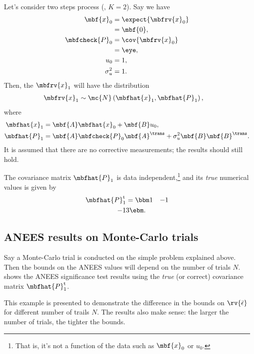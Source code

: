 \documentclass{simple-article}
\begin{document}
Let's consider two steps process (\ie, $K = 2$). Say we have 
\begin{align}
  \mbf{x}_{0} &= \expect{\mbfrv{x}_{0}}\\
              &= \mbf{0}, \\
  \mbfcheck{P}_{0} &= \cov{\mbfrv{x}_{0}}\\
                   &= \eye,\\
  u_{0} &= 1, \\
  \sigma_{u}^{2} &= 1.
\end{align}
Then, the $\mbfrv{x}_{1}$ will have the distribution
\begin{align}
  \mbfrv{x}_{1} &\sim\mc{N}\left( \mbfhat{x}_{1}, \mbfhat{P}_{1} \right),
\end{align}
where
\begin{align}
  \mbfhat{x}_{1} &= \mbf{A}\mbfhat{x}_{0} + \mbf{B}u_{0},\\
  \mbfhat{P}_{1} &= \mbf{A}\mbfcheck{P}_{0}\mbf{A}^{\trans} + \sigma_{u}^{2}\mbf{B}\mbf{B}^{\trans}.
\end{align}
It is assumed that there are no corrective measurements; the results should still hold. 

The covariance matrix $\mbfhat{P}_{1}$ is data independent,\footnote{That is, it's not a function of the data such as $\mbf{x}_{0}$ or $u_{0}$.} and its \emph{true} numerical values is given by
\begin{align}
  \label{eq:mbfhatP1 true value}
  \mbfhat{P}^{\mathrm{t}}_{1} &= \bbm 1 & -1\\-1 & 3 \ebm.
\end{align}

\subsection{ANEES results on Monte-Carlo trials}
Say a Monte-Carlo trial is conducted on the simple problem explained above. Then the bounds on the ANEES values will depend on the number of trials $N$.  shows the ANEES significance test results using the \emph{true} (or correct) covariance matrix $\mbfhat{P}_{1}^{\mathrm{t}}$. 

This example is presented to demonstrate the difference in the bounds on $\rv{\bar{\epsilon}}$ for different number of trails $N$. The results also make sense: the larger the number of trials, the tighter the bounds. 
\end{document}
